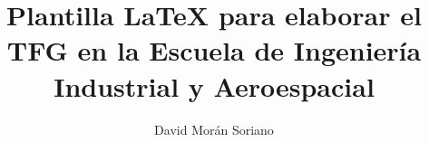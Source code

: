 
\title{Plantilla \LaTeX{} para elaborar el TFG en la Escuela de Ingeniería Industrial y Aeroespacial}
\author{David Morán Soriano}










\address{UCLM --- Escuela de Ingeniería Industrial y Aeroespacial\\
    Campus Universitario de la Real Fábrica de Armas}
